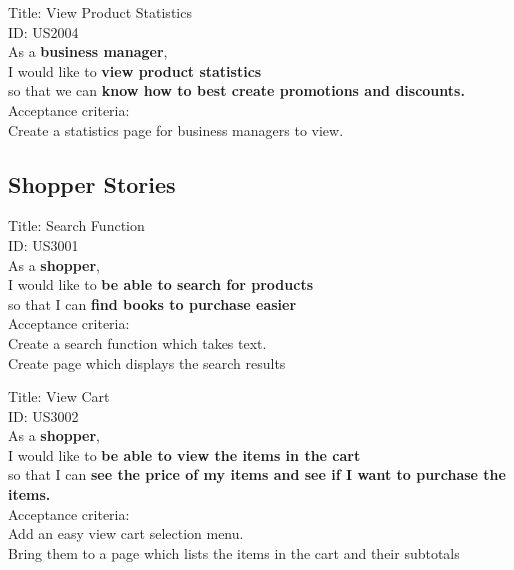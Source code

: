 \documentclass{article}
\begin{document}
\begin{framed}
\noindent
Title: View Product Statistics \\
ID: US2004 \\
As a \textbf{business manager},\\
 \textbullet  \quad \quad I would like to \textbf{view product statistics}\\ 
 \textbullet  \quad \quad so that we can \textbf{know how to best create promotions and discounts. }\\
 Acceptance criteria: \\
  \textbullet  \quad \quad Create a statistics page for business managers to view. \\
\end{framed}


\subsection{Shopper Stories}


\begin{framed}
\noindent
Title: Search Function \\
ID: US3001 \\
As a \textbf{shopper},\\
 \textbullet  \quad \quad I would like to \textbf{be able to search for products}\\ 
 \textbullet  \quad \quad so that I can \textbf{find books to purchase easier}\\
 Acceptance criteria: \\
  \textbullet  \quad \quad Create a search function which takes text. \\
  \textbullet  \quad \quad Create page which displays the search results \\
\end{framed}



\begin{framed}
\noindent
Title: View Cart \\
ID: US3002 \\
As a \textbf{shopper},\\
 \textbullet  \quad \quad I would like to \textbf{be able to view the items in the cart}\\ 
 \textbullet  \quad \quad so that I can \textbf{see the price of my items and see if I want to purchase the items.}\\
 Acceptance criteria: \\
  \textbullet  \quad \quad Add an easy view cart selection menu. \\
  \textbullet  \quad \quad Bring them to a page which lists the items in the cart and their subtotals\\
\end{framed}
\end{document}
